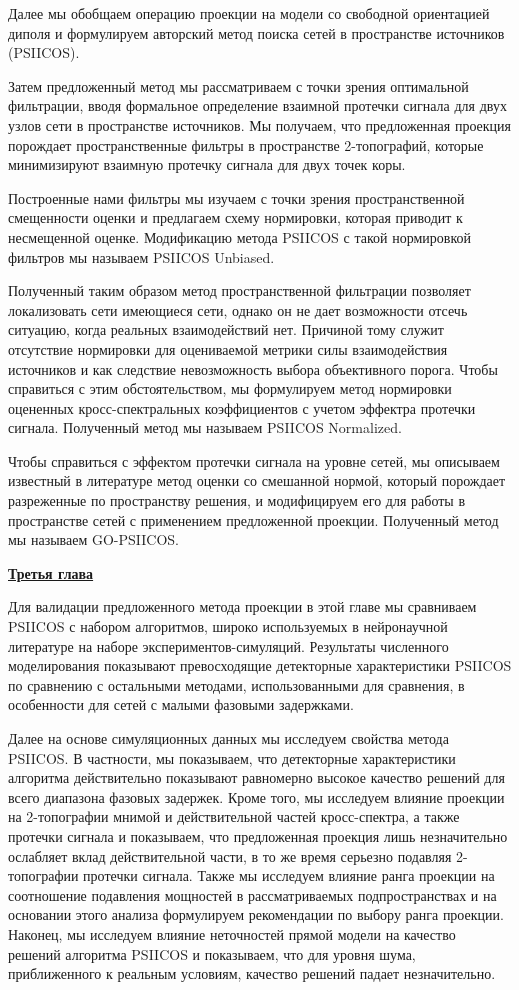 Далее мы обобщаем операцию проекции на модели со свободной ориентацией диполя и формулируем
авторский метод поиска сетей в пространстве источников (PSIICOS).

Затем предложенный метод мы рассматриваем с точки зрения оптимальной фильтрации, вводя формальное
определение взаимной протечки сигнала для двух узлов сети в пространстве источников.
Мы получаем, что предложенная проекция порождает пространственные фильтры в
пространстве 2-топографий, которые минимизируют взаимную протечку сигнала для двух точек коры.

Построенные нами фильтры мы изучаем с точки зрения пространственной смещенности оценки
и предлагаем схему нормировки, которая приводит к несмещенной оценке. Модификацию
метода PSIICOS с такой нормировкой фильтров мы называем PSIICOS Unbiased.

Полученный таким образом метод пространственной фильтрации позволяет локализовать
сети имеющиеся сети, однако он не дает возможности отсечь ситуацию, когда
реальных взаимодействий нет. Причиной тому служит отсутствие нормировки для
оцениваемой метрики силы взаимодействия источников и как следствие невозможность выбора
объективного порога.
Чтобы справиться с этим обстоятельством, мы формулируем метод нормировки оцененных
кросс-спектральных коэффициентов с учетом эффектра протечки сигнала. Полученный
метод мы называем PSIICOS Normalized.


Чтобы справиться с эффектом протечки сигнала на уровне сетей,
мы описываем известный в литературе метод оценки со смешанной нормой,
который порождает разреженные по пространству решения,
и модифицируем его для работы в пространстве сетей с применением
предложенной проекции. Полученный метод мы называем GO-PSIICOS.


\underline{\textbf{Третья глава}}

Для валидации предложенного метода проекции в этой главе мы
сравниваем PSIICOS с набором алгоритмов, широко используемых
в нейронаучной литературе на наборе экспериментов-симуляций.
Результаты численного моделирования показывают превосходящие детекторные
характеристики PSIICOS по сравнению с остальными методами, использованными
для сравнения, в особенности для сетей с малыми фазовыми задержками.

Далее на основе симуляционных данных мы исследуем свойства метода PSIICOS.\@
В частности, мы показываем, что детекторные характеристики алгоритма действительно
показывают равномерно высокое качество решений для всего диапазона фазовых
задержек. Кроме того, мы исследуем влияние проекции на 2-топографии мнимой и действительной
частей кросс-спектра, а также протечки сигнала и показываем, что предложенная проекция
лишь незначительно ослабляет вклад действительной части, в то же время
серьезно подавляя 2-топографии протечки сигнала. Также мы исследуем влияние
ранга проекции на соотношение подавления мощностей в рассматриваемых подпространствах
и на основании этого анализа формулируем рекомендации по выбору ранга проекции.
Наконец, мы исследуем влияние неточностей прямой модели на качество решений алгоритма
PSIICOS и показываем, что для уровня шума, приближенного к реальным условиям,
качество решений падает незначительно.

